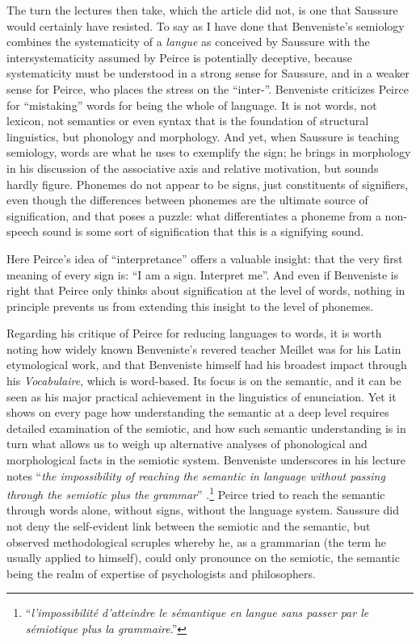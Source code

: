 \documentclass[output=paper]{langscibook}
\begin{document}
The turn the lectures then take, which the article did not, is one that Saussure would certainly have resisted. To say as I have done that Benveniste's semiology combines the systematicity of a \emph{langue} as conceived by Saussure with the intersystematicity assumed by Peirce is potentially deceptive, because systematicity must be understood in a strong sense for Saussure, and in a weaker sense for Peirce, who places the stress on the ``inter-''. Benveniste criticizes Peirce for ``mistaking'' words for being the whole of language. It is not words, not lexicon, not semantics or even syntax that is the foundation of structural linguistics, but phonology and morphology. And yet, when Saussure is teaching semiology, words are what he uses to exemplify the sign; he brings in morphology in his discussion of the associative axis and relative motivation, but sounds hardly figure. Phonemes do not appear to be signs, just constituents of signifiers, even though the differences between phonemes are the ultimate source of signification, and that poses a puzzle: what differentiates a phoneme from a non-speech sound is some sort of signification that this is a signifying sound.

Here Peirce's idea of ``interpretance'' offers a valuable insight: that the very first meaning of every sign is: ``I am a sign. Interpret me''. And even if Benveniste is right that Peirce only thinks about signification at the level of words, nothing in principle prevents us from extending this insight to the level of phonemes.

Regarding his critique of Peirce for reducing languages to words, it is worth noting how widely known Benveniste's revered teacher Meillet was for his Latin etymological work, and that Benveniste himself had his broadest impact through his \citeyear{Benveniste1969vocabulaire} \emph{Vocabulaire}, which is word-based. Its focus is on the semantic, and it can be seen as his major practical achievement in the linguistics of enunciation. Yet it shows on every page how understanding the semantic at a deep level requires detailed examination of the semiotic, and how such semantic understanding is in turn what allows us to weigh up alternative analyses of phonological and morphological facts in the semiotic system. Benveniste underscores in his lecture notes ``\emph{the impossibility of reaching the semantic in language without passing through the semiotic plus the grammar}'' \citep[114]{Benveniste1969vocabulaire}.\footnote{``\emph{l'impossibilité d'atteindre le sémantique en langue sans passer par le sémiotique plus la grammaire}.''} Peirce tried to reach the semantic through words alone, without signs, without the language system. Saussure did not deny the self-evident link between the semiotic and the semantic, but observed methodological scruples whereby he, as a grammarian (the term he usually applied to himself), could only pronounce on the semiotic, the semantic being the realm of expertise of psychologists and philosophers.
\end{document}
